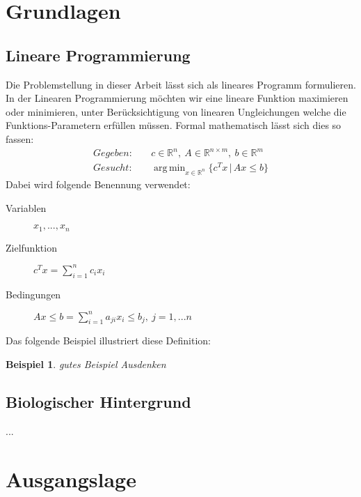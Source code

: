 \documentclass[12pt,ngerman,titlepage,a4paper]{article}
\newtheorem{example}[theorem]{Beispiel}
\DeclareMathOperator*{\argmin}{arg\,min}
\begin{document}
\section{Grundlagen}
\subsection{Lineare Programmierung}

Die Problemstellung in dieser Arbeit lässt sich als lineares Programm formulieren. In der Linearen Programmierung möchten wir eine lineare Funktion maximieren oder minimieren, unter Berücksichtigung von linearen Ungleichungen welche die Funktions-Parametern erfüllen müssen.
Formal mathematisch lässt sich dies so fassen:
\begin{align*}
	Gegeben:&\quad c \in \mathbb{R}^{n},\ A \in \mathbb{R}^{n \times m},\ b \in \mathbb{R}^{m} \\
	Gesucht:&\quad \argmin_{ x\in \mathbb{R}^n}\{c^Tx\,|\, Ax \leq b\}
\end{align*}
Dabei wird folgende Benennung verwendet:
\begin{description}
\item[\quad Variablen] $x_1,..., x_n$
\item[\quad Zielfunktion]  $c^Tx = \sum_{i=1}^n c_i x_i$
\item[\quad Bedingungen]  $Ax \leq b = \sum_{i=1}^n a_{ji} x_i \leq b_j, \ j = 1,...n$
\end{description} Das folgende Beispiel illustriert diese Definition:
\begin{example}
	gutes Beispiel Ausdenken
\end{example}

\subsection{Biologischer Hintergrund}

...

\section{Ausgangslage}
\end{document}
